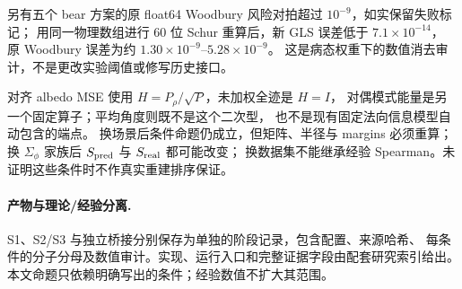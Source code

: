 另有五个 bear 方案的原 float64 Woodbury 风险对拍超过 $10^{-9}$，如实保留失败标记；
用同一物理数组进行 $60$ 位 Schur 重算后，新 GLS 误差低于 $7.1\times10^{-14}$，
原 Woodbury 误差为约 $1.30\times10^{-9}$--$5.28\times10^{-9}$。
这是病态权重下的数值消去审计，不是更改实验阈值或修写历史接口。

对齐 albedo MSE 使用 $H=P_\rho/\sqrt{P}$，未加权全迹是 $H=I$，
对偶模式能量是另一个固定算子；平均角度则既不是这个二次型，
也不是现有固定法向信息模型自动包含的端点。
换场景后条件命题仍成立，但矩阵、半径与 margins 必须重算；
换 $\Sigma_\phi$ 家族后 $S_{\rm pred}$ 与 $S_{\rm real}$ 都可能改变；
换数据集不能继承经验 Spearman。未证明这些条件时不作真实重建排序保证。

\paragraph{产物与理论/经验分离.}
S1、S2/S3 与独立桥接分别保存为单独的阶段记录，包含配置、来源哈希、
每条件的分子分母及数值审计。实现、运行入口和完整证据字段由配套研究索引给出。
本文命题只依赖明确写出的条件；经验数值不扩大其范围。
